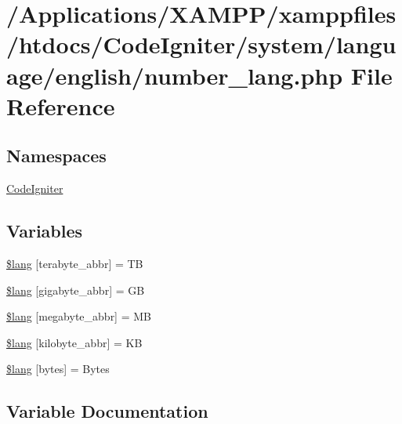 \hypertarget{number__lang_8php}{}\section{/\+Applications/\+X\+A\+M\+P\+P/xamppfiles/htdocs/\+Code\+Igniter/system/language/english/number\+\_\+lang.php File Reference}
\label{number__lang_8php}
\subsection*{Namespaces}
\begin{DoxyCompactItemize}
\item 
 \mbox{\hyperlink{namespace_code_igniter}{Code\+Igniter}}
\end{DoxyCompactItemize}
\subsection*{Variables}
\begin{DoxyCompactItemize}
\item 
\mbox{\hyperlink{number__lang_8php_a04d138a22ffa60be85d7f5cc39d19edb}{\$lang}} \mbox{[}\textquotesingle{}terabyte\+\_\+abbr\textquotesingle{}\mbox{]} = \textquotesingle{}TB\textquotesingle{}
\item 
\mbox{\hyperlink{number__lang_8php_a033241e728572623642c100b94ae5cdf}{\$lang}} \mbox{[}\textquotesingle{}gigabyte\+\_\+abbr\textquotesingle{}\mbox{]} = \textquotesingle{}GB\textquotesingle{}
\item 
\mbox{\hyperlink{number__lang_8php_a302efee241ac11afb35642b3c2fe7da8}{\$lang}} \mbox{[}\textquotesingle{}megabyte\+\_\+abbr\textquotesingle{}\mbox{]} = \textquotesingle{}MB\textquotesingle{}
\item 
\mbox{\hyperlink{number__lang_8php_ab73e0c5fca6f933d051322e005a58b92}{\$lang}} \mbox{[}\textquotesingle{}kilobyte\+\_\+abbr\textquotesingle{}\mbox{]} = \textquotesingle{}KB\textquotesingle{}
\item 
\mbox{\hyperlink{number__lang_8php_a2d19ef1c5fb52a9f8eb7dcc3f210a36f}{\$lang}} \mbox{[}\textquotesingle{}bytes\textquotesingle{}\mbox{]} = \textquotesingle{}Bytes\textquotesingle{}
\end{DoxyCompactItemize}


\subsection{Variable Documentation}
\mbox{\label{number__lang_8php_a04d138a22ffa60be85d7f5cc39d19edb}} 
